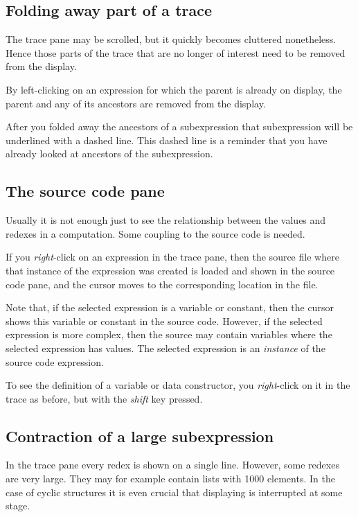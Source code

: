 \documentclass[12pt]{article}
\begin{document}
\subsection{Folding away part of a trace}

The trace pane may be scrolled, but it quickly becomes cluttered nonetheless. Hence those parts of the trace that are no longer of interest need to be removed from the display.

By left-clicking on an expression for which the parent is already on display,
the parent and any of its ancestors are removed from the display.

After you folded away the ancestors of a subexpression that subexpression will be underlined with a dashed line. This dashed line is a reminder that you have already looked at ancestors of the subexpression.


\subsection{The source code pane}\label{source}

Usually it is not enough just to see the relationship between the values and redexes in a computation. Some coupling to the source code is needed.

If you \emph{right}-click on an expression in the trace pane, then the source file where that instance of the expression was created is loaded and shown in the source code pane, and the cursor moves to the corresponding location in the file.

Note that, if the selected expression is a variable or constant, then the cursor shows this variable or constant in the source code. However, if the selected expression is more complex, then the source may contain variables where the selected expression has values. The selected expression is an \emph{instance} of the source code expression.

To see the definition of a variable or data constructor, you \emph{right}-click on it in the trace as before, but with the \emph{shift} key pressed.


\subsection{Contraction of a large subexpression}

In the trace pane every redex is shown on a single line.
However, some redexes are very large. They may for example contain lists with 1000 elements. In the case of cyclic structures it is even crucial that displaying is interrupted at some stage. 
\end{document}

